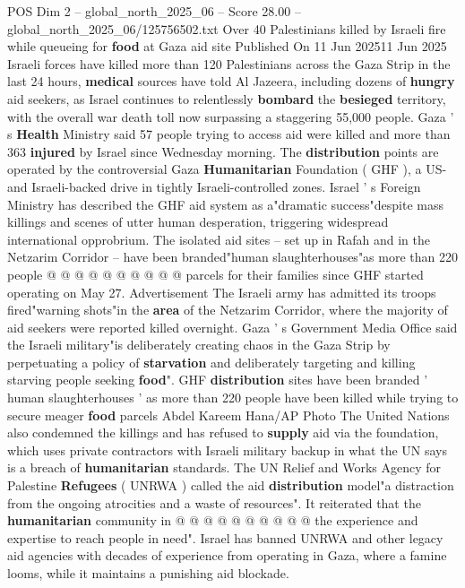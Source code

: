 \begin{textsample}{POS Dim 2 – global\_north\_2025\_06 – Score 28.00 – global\_north\_2025\_06/125756502.txt}  \label{ex:f2_pos_229}
Over 40 Palestinians killed by Israeli fire while queueing for \textbf{food} at Gaza aid site Published On 11 Jun 202511 Jun 2025 Israeli forces have killed more than 120 Palestinians across the Gaza Strip in the last 24 hours, \textbf{medical} sources have told Al Jazeera, including dozens of \textbf{hungry} aid seekers, as Israel continues to relentlessly \textbf{bombard} the \textbf{besieged} territory, with the overall war death toll now surpassing a staggering 55,000 people.
Gaza ' s \textbf{Health} Ministry said 57 people trying to access aid were killed and more than 363 \textbf{injured} by Israel since Wednesday morning.
The \textbf{distribution} points are operated by the controversial Gaza \textbf{Humanitarian} Foundation ( GHF ), a US- and Israeli-backed drive in tightly Israeli-controlled zones.
Israel ' s Foreign Ministry has described the GHF aid system as a"dramatic success"despite mass killings and scenes of utter human desperation, triggering widespread international opprobrium.
The isolated aid sites -- set up in Rafah and in the Netzarim Corridor -- have been branded"human slaughterhouses"as more than 220 people @ @ @ @ @ @ @ @ @ @ parcels for their families since GHF started operating on May 27.
Advertisement The Israeli army has admitted its troops fired"warning shots"in the \textbf{area} of the Netzarim Corridor, where the majority of aid seekers were reported killed overnight.
Gaza ' s Government Media Office said the Israeli military"is deliberately creating chaos in the Gaza Strip by perpetuating a policy of \textbf{starvation} and deliberately targeting and killing starving people seeking \textbf{food}".
GHF \textbf{distribution} sites have been branded ' human slaughterhouses ' as more than 220 people have been killed while trying to secure meager \textbf{food} parcels Abdel Kareem Hana/AP Photo The United Nations also condemned the killings and has refused to \textbf{supply} aid via the foundation, which uses private contractors with Israeli military backup in what the UN says is a breach of \textbf{humanitarian} standards.
The UN Relief and Works Agency for Palestine \textbf{Refugees} ( UNRWA ) called the aid \textbf{distribution} model"a distraction from the ongoing atrocities and a waste of resources".
It reiterated that the \textbf{humanitarian} community in @ @ @ @ @ @ @ @ @ @ the experience and expertise to reach people in need".
Israel has banned UNRWA and other legacy aid agencies with decades of experience from operating in Gaza, where a famine looms, while it maintains a punishing aid blockade.

\end{textsample}
